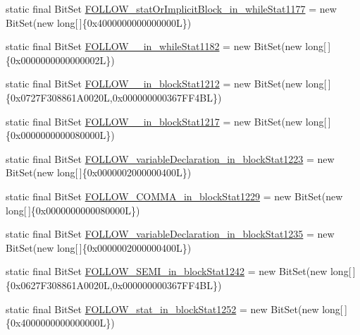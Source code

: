 \begin{DoxyCompactItemize}
\item 
static final Bit\-Set \hyperlink{classorg_1_1tzi_1_1use_1_1parser_1_1soil_1_1_soil_parser_a359316247b0c5f7939b1fe6d939dd49a}{F\-O\-L\-L\-O\-W\-\_\-stat\-Or\-Implicit\-Block\-\_\-in\-\_\-while\-Stat1177} = new Bit\-Set(new long\mbox{[}$\,$\mbox{]}\{0x4000000000000000\-L\})
\item 
static final Bit\-Set \hyperlink{classorg_1_1tzi_1_1use_1_1parser_1_1soil_1_1_soil_parser_a48d375730333fb29827ef19bbf093e60}{F\-O\-L\-L\-O\-W\-\_\-\_\-in\-\_\-while\-Stat1182} = new Bit\-Set(new long\mbox{[}$\,$\mbox{]}\{0x0000000000000002\-L\})
\item 
static final Bit\-Set \hyperlink{classorg_1_1tzi_1_1use_1_1parser_1_1soil_1_1_soil_parser_a4c8ee2cfea9c0cd338a2985d54e69158}{F\-O\-L\-L\-O\-W\-\_\-\_\-in\-\_\-block\-Stat1212} = new Bit\-Set(new long\mbox{[}$\,$\mbox{]}\{0x0727\-F308861\-A0020\-L,0x000000000367\-F\-F4\-B\-L\})
\item 
static final Bit\-Set \hyperlink{classorg_1_1tzi_1_1use_1_1parser_1_1soil_1_1_soil_parser_a5b5304f30c5f41879ab69cc2936f5df3}{F\-O\-L\-L\-O\-W\-\_\-\_\-in\-\_\-block\-Stat1217} = new Bit\-Set(new long\mbox{[}$\,$\mbox{]}\{0x0000000000080000\-L\})
\item 
static final Bit\-Set \hyperlink{classorg_1_1tzi_1_1use_1_1parser_1_1soil_1_1_soil_parser_a4892e25b1906207b3ddfccaa47484085}{F\-O\-L\-L\-O\-W\-\_\-variable\-Declaration\-\_\-in\-\_\-block\-Stat1223} = new Bit\-Set(new long\mbox{[}$\,$\mbox{]}\{0x0000002000000400\-L\})
\item 
static final Bit\-Set \hyperlink{classorg_1_1tzi_1_1use_1_1parser_1_1soil_1_1_soil_parser_ae90bb5a56b7738647d9467a74931e975}{F\-O\-L\-L\-O\-W\-\_\-\-C\-O\-M\-M\-A\-\_\-in\-\_\-block\-Stat1229} = new Bit\-Set(new long\mbox{[}$\,$\mbox{]}\{0x0000000000080000\-L\})
\item 
static final Bit\-Set \hyperlink{classorg_1_1tzi_1_1use_1_1parser_1_1soil_1_1_soil_parser_a241e372c8ff0f9e88168e4df56041744}{F\-O\-L\-L\-O\-W\-\_\-variable\-Declaration\-\_\-in\-\_\-block\-Stat1235} = new Bit\-Set(new long\mbox{[}$\,$\mbox{]}\{0x0000002000000400\-L\})
\item 
static final Bit\-Set \hyperlink{classorg_1_1tzi_1_1use_1_1parser_1_1soil_1_1_soil_parser_a76d850263cc5121e824d08c6559b43d4}{F\-O\-L\-L\-O\-W\-\_\-\-S\-E\-M\-I\-\_\-in\-\_\-block\-Stat1242} = new Bit\-Set(new long\mbox{[}$\,$\mbox{]}\{0x0627\-F308861\-A0020\-L,0x000000000367\-F\-F4\-B\-L\})
\item 
static final Bit\-Set \hyperlink{classorg_1_1tzi_1_1use_1_1parser_1_1soil_1_1_soil_parser_a0ce2a7f608814b00087939e0dbcf8750}{F\-O\-L\-L\-O\-W\-\_\-stat\-\_\-in\-\_\-block\-Stat1252} = new Bit\-Set(new long\mbox{[}$\,$\mbox{]}\{0x4000000000000000\-L\})

\end{DoxyCompactItemize}
